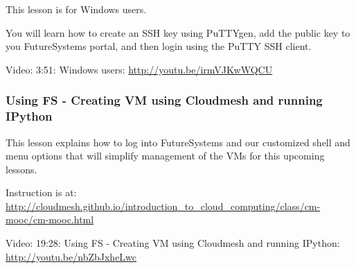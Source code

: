 This lesson is for Windows users.

You will learn how to create an SSH key using PuTTYgen, add the public
key to you FutureSystems portal, and then login using the PuTTY SSH
client.

Video: 3:51: Windows users: \url{http://youtu.be/irmVJKwWQCU}

\subsubsection{Using FS - Creating VM using Cloudmesh and running
IPython}\label{using-fs---creating-vm-using-cloudmesh-and-running-ipython}

This lesson explains how to log into FutureSystems and our customized
shell and menu options that will simplify management of the VMs for this
upcoming lessons.

Instruction is at:
\url{http://cloudmesh.github.io/introduction_to_cloud_computing/class/cm-mooc/cm-mooc.html}

Video: 19:28: Using FS - Creating VM using Cloudmesh and running
IPython: \url{http://youtu.be/nbZbJxheLwc}
